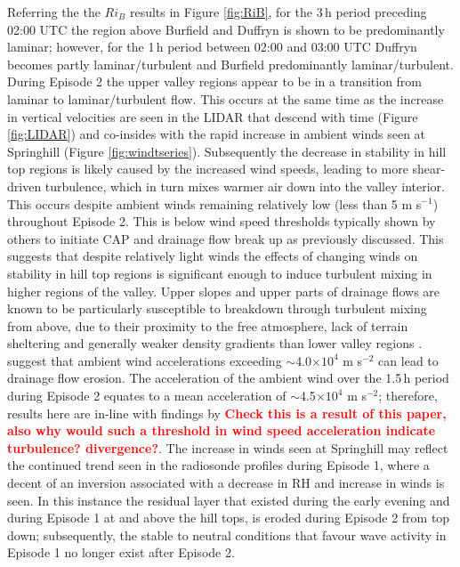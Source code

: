 \documentclass[times]{qjrms4}
\begin{document}
Referring the the $Ri_{B}$ results in Figure \ref{fig:RiB}, for the 3$\,\mbox{h}$ period preceding 02:00 UTC the region above Burfield and Duffryn is shown to  be predominantly laminar; however, for the 1$\,\mbox{h}$ period between 02:00 and 03:00 UTC Duffryn becomes partly laminar/turbulent and Burfield predominantly laminar/turbulent. During Episode 2 the upper valley regions appear to be in a transition from laminar to laminar/turbulent flow. This occurs at the same time as the increase in vertical velocities are seen in the LIDAR that descend with time (Figure \ref{fig:LIDAR}) and co-insides with the rapid increase in ambient winds seen at Springhill (Figure \ref{fig:windtseries}). Subsequently the decrease in stability in hill top regions is likely caused by the increased wind speeds, leading to more shear-driven turbulence, which in turn mixes warmer air down into the valley interior. This occurs despite ambient winds remaining relatively low (less than 5 m s$^{-1}$) throughout Episode 2. This is below wind speed thresholds typically shown by others to initiate CAP and drainage flow break up as previously discussed. This suggests that despite relatively light winds the effects of changing winds on stability in hill top regions is significant enough to induce turbulent mixing in higher regions of the valley. Upper slopes and upper parts of drainage flows are known to be particularly susceptible to breakdown through turbulent mixing from above, due to their proximity to the free atmosphere, lack of terrain sheltering and generally weaker density gradients than lower valley regions \citep{barr1989influence,gudiksen1992measurements}. \citet{orgill1992mesoscale} suggest that ambient wind accelerations exceeding $\sim$4.0$\times10^4$ m s$^{-2}$ can lead to drainage flow erosion. The acceleration of the ambient wind over the 1.5$\,\mbox{h}$ period during Episode 2 equates to a mean acceleration of $\sim$4.5$\times10^4$ m s$^{-2}$; therefore, results here are in-line with findings by \citet{orgill1992mesoscale}\textcolor{red}{\bf Check this is a result of this paper, also why would such a threshold in wind speed acceleration indicate turbulence? divergence?}. The increase in winds seen at Springhill may reflect the continued trend seen in the radiosonde profiles during Episode 1, where a decent of an inversion associated with a decrease in RH and increase in winds is seen. In this instance the residual layer that existed during the early evening and during Episode 1 at and above the hill tops, is eroded during Episode 2 from top down; subsequently, the stable to neutral conditions that favour wave activity in Episode 1 no longer exist after Episode 2.
\end{document}
